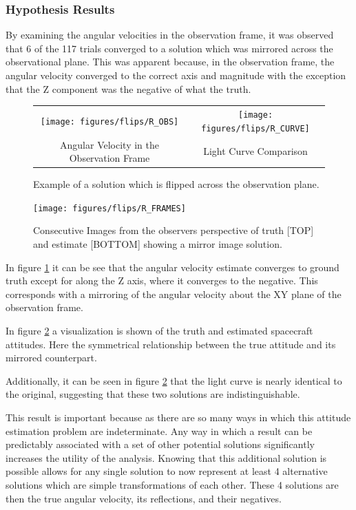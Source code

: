 \subsubsection{Hypothesis Results}

By examining the angular velocities in the observation frame, it was observed that 6 of the 117 trials converged to a solution which was mirrored across the observational plane. This was apparent because, in the observation frame, the angular velocity converged to the correct axis and magnitude with the exception that the Z component was the negative of what the truth.

\begin{figure}[ht]\label{flipped_obs}
	\begin{tabular}{cc}
		\texttt{[image: figures/flips/R\_OBS]} &
		\texttt{[image: figures/flips/R\_CURVE]} \\
		Angular Velocity in the Observation Frame & Light Curve Comparison
	\end{tabular}
	\caption{Example of a solution which is flipped across the observation plane.}
\end{figure}

\begin{figure}[ht]\label{flipped_frames}
	\begin{center}
		\texttt{[image: figures/flips/R\_FRAMES]}
	\end{center}
	\caption{Consecutive Images from the observers perspective of truth [TOP] and estimate [BOTTOM] showing a mirror image solution.}
\end{figure}

In figure \ref{flipped_obs} it can be see that the angular velocity estimate converges to ground truth except for along the Z axis, where it converges to the negative. This corresponds with a mirroring of the angular velocity about the XY plane of the observation frame.

In figure \ref{flipped_frames} a visualization is shown of the truth and estimated spacecraft attitudes. Here the symmetrical relationship between the true attitude and its mirrored counterpart.

Additionally, it can be seen in figure \ref{flipped_frames} that the light curve is nearly identical to the original, suggesting that these two solutions are indistinguishable.

This result is important because as there are so many ways in which this attitude estimation problem are indeterminate. Any way in which a result can be predictably associated with a set of other potential solutions significantly increases the utility of the analysis. Knowing that this additional solution is possible allows for any single solution to now represent at least 4 alternative solutions which are simple transformations of each other. These 4 solutions are then the true angular velocity, its reflections, and their negatives.

